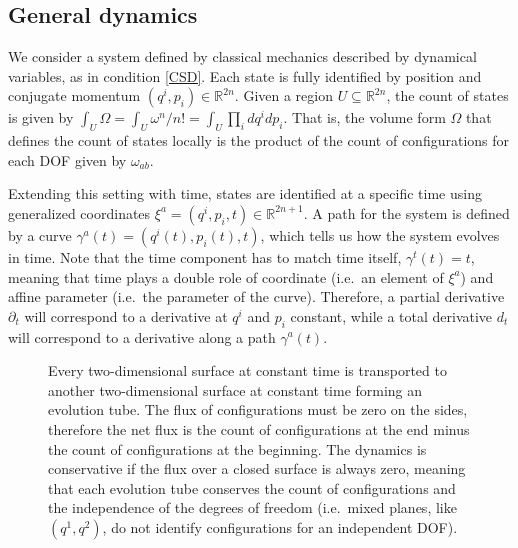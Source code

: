 \documentclass[nofootinbib,aps,pre]{revtex4-2}
\begin{document}
\subsection{General dynamics}

We consider a system defined by classical mechanics described by dynamical variables, as in condition \ref{CSD}. Each state is fully identified by position and conjugate momentum $(q^i,p_i) \in \mathbb{R}^{2n}$. Given a region $U \subseteq \mathbb{R}^{2n}$, the count of states is given by $\int_U \Omega = \int_U \omega^n / n! = \int_U \prod_i dq^i dp_i$. That is, the volume form $\Omega$ that defines the count of states locally is the product of the count of configurations for each DOF given by $\omega_{ab}$.

Extending this setting with time, states are identified at a specific time using generalized coordinates $\xi^a = (q^i,p_i,t) \in \mathbb{R}^{2n+1}$. A path for the system is defined by a curve $\gamma^a(t) = (q^i(t), p_i(t), t)$, which tells us how the system evolves in time. Note that the time component has to match time itself, $\gamma^t(t) = t$, meaning that time plays a double role of coordinate (i.e.~an element of $\xi^a$) and affine parameter (i.e.~the parameter of the curve). Therefore, a partial derivative $\partial_t$ will correspond to a derivative at $q^i$ and $p_i$ constant, while a total derivative $d_t$ will correspond to a derivative along a path $\gamma^a(t)$.

\begin{figure}[h]
    \centering
	
    \caption{Every two-dimensional surface at constant time is transported to another two-dimensional surface at constant time forming an evolution tube. The flux of configurations must be zero on the sides, therefore the net flux is the count of configurations at the end minus the count of configurations at the beginning. The dynamics is conservative if the flux over a closed surface is always zero, meaning that each evolution tube conserves the count of configurations and the independence of the degrees of freedom (i.e.~mixed planes, like $(q^1,q^2)$, do not identify configurations for an independent DOF).}\label{evolutionTube}
\end{figure}
\end{document}
